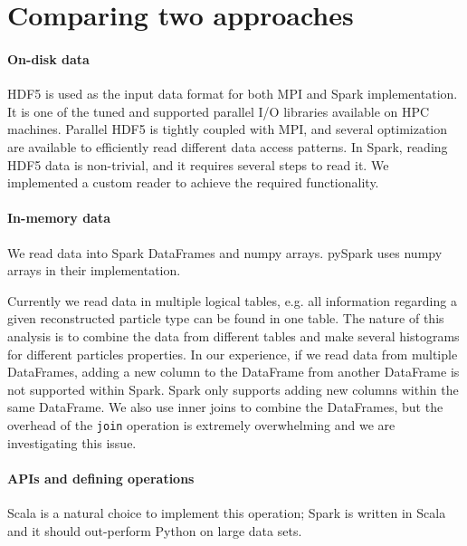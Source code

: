 \documentclass[11pt, twocolumn]{article}
\newcommand{\squeezeup}{\vspace{-5.5mm}}
\begin{document}
\section{Comparing two approaches}
\squeezeup
 \paragraph{On-disk data} 
HDF5 is used as the input data format for both MPI and Spark implementation. 
It is one of the tuned and supported parallel I/O libraries available on HPC machines. 
Parallel HDF5 is tightly coupled with MPI, and several optimization are 
available to efficiently read different data access patterns. 
In Spark, reading HDF5 data is non-trivial, and it requires several steps 
to read it. We implemented a custom reader to achieve the required functionality. 

\paragraph{In-memory data}
We read data into Spark DataFrames and numpy arrays. 
pySpark uses numpy arrays in their implementation. 

Currently we read data in multiple logical tables, e.g. all information regarding 
a given reconstructed particle type can be found in one table. The nature of this analysis is to 
combine the data from different tables 
and make several histograms for different particles properties. 
In our experience, if we read data from multiple DataFrames, 
adding a new column to the DataFrame from another 
DataFrame is not supported within Spark. Spark only supports adding new columns within the same DataFrame. 
We also use inner joins to combine the DataFrames, but the overhead of the 
\texttt{join} operation is extremely overwhelming and we are investigating this issue. 

\paragraph{APIs and defining operations} 
Scala is a natural choice to implement this operation; Spark is written in Scala 
and it should out-perform Python on large data sets.  
\end{document}
